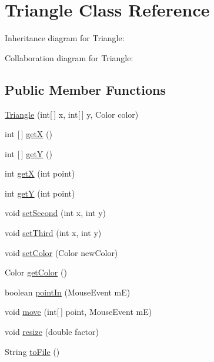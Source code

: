 \hypertarget{classTriangle}{}\section{Triangle Class Reference}
\label{classTriangle}


Inheritance diagram for Triangle\+:


Collaboration diagram for Triangle\+:
\subsection*{Public Member Functions}
\begin{DoxyCompactItemize}
\item 
\hyperlink{classTriangle_aed317874cff274d260d1db5de736ddaa}{Triangle} (int\mbox{[}$\,$\mbox{]} x, int\mbox{[}$\,$\mbox{]} y, Color color)
\item 
int \mbox{[}$\,$\mbox{]} \hyperlink{classTriangle_a4bef2d535093c6674ebe06291b72c823}{getX} ()
\item 
int \mbox{[}$\,$\mbox{]} \hyperlink{classTriangle_ab03557892090f07ef3bc5bc4ec612f6a}{getY} ()
\item 
int \hyperlink{classTriangle_a5a50f4cf54c6350b3e3bc8d239fe5b12}{getX} (int point)
\item 
int \hyperlink{classTriangle_ae4400d63c47585241747669c521217df}{getY} (int point)
\item 
void \hyperlink{classTriangle_af67a3dc7d192c0cb93fa2a72d01c0ba1}{set\+Second} (int x, int y)
\item 
void \hyperlink{classTriangle_a829c600b572f4f4e0d205f97d69dd764}{set\+Third} (int x, int y)
\item 
void \hyperlink{classTriangle_a6eeb13ec68899a88f0ac1a3bc4f8eb3f}{set\+Color} (Color new\+Color)
\item 
Color \hyperlink{classTriangle_a482b51f3f22de2f283c8d73eec2270ad}{get\+Color} ()
\item 
boolean \hyperlink{classTriangle_aefc686faa4251f80a2f8db82dc962fe5}{point\+In} (Mouse\+Event mE)
\item 
void \hyperlink{classTriangle_aff9f2ebdc361427e699bdc32cdc67589}{move} (int\mbox{[}$\,$\mbox{]} point, Mouse\+Event mE)
\item 
void \hyperlink{classTriangle_a2c8b06fdba401b31c2eb92da12e08413}{resize} (double factor)
\item 
String \hyperlink{classTriangle_a3d6a35a828f17de76b170f376fbd1b27}{to\+File} ()
\end{DoxyCompactItemize}


